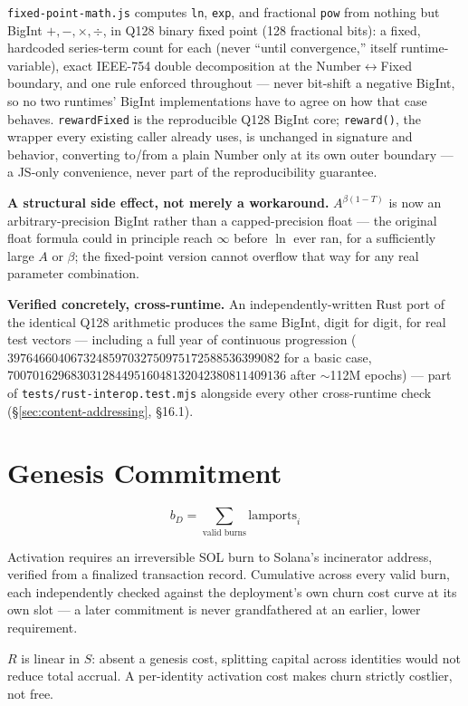 \documentclass[10pt]{article}
\newcommand{\code}[1]{\texttt{\small #1}}
\begin{document}
\code{fixed-point-math.js} computes \code{ln}, \code{exp}, and fractional \code{pow} from nothing but BigInt $+, -, \times, \div$, in Q128 binary fixed point (128 fractional bits): a fixed, hardcoded series-term count for each (never ``until convergence,'' itself runtime-variable), exact IEEE-754 double decomposition at the Number$\leftrightarrow$Fixed boundary, and one rule enforced throughout --- never bit-shift a negative BigInt, so no two runtimes' BigInt implementations have to agree on how that case behaves. \code{rewardFixed} is the reproducible Q128 BigInt core; \code{reward()}, the wrapper every existing caller already uses, is unchanged in signature and behavior, converting to/from a plain Number only at its own outer boundary --- a JS-only convenience, never part of the reproducibility guarantee.

\textbf{A structural side effect, not merely a workaround.} $A^{\beta(1-T)}$ is now an arbitrary-precision BigInt rather than a capped-precision float --- the original float formula could in principle reach $\infty$ before $\ln$ ever ran, for a sufficiently large $A$ or $\beta$; the fixed-point version cannot overflow that way for any real parameter combination.

\textbf{Verified concretely, cross-runtime.} An independently-written Rust port of the identical Q128 arithmetic produces the same BigInt, digit for digit, for real test vectors --- including a full year of continuous progression ($3976466040673248597032750975172588536399082$ for a basic case, $70070162968303128449516048132042380811409136$ after $\sim$112M epochs) --- part of \code{tests/rust-interop.test.mjs} alongside every other cross-runtime check (\S\ref{sec:content-addressing}, \S16.1).

\section{Genesis Commitment}
\label{sec:genesis}

\[
b_D = \sum_{\text{valid burns}} \mathrm{lamports}_i
\]

Activation requires an irreversible SOL burn to Solana's incinerator address, verified from a finalized transaction record. Cumulative across every valid burn, each independently checked against the deployment's own churn cost curve at its own slot --- a later commitment is never grandfathered at an earlier, lower requirement.

$R$ is linear in $S$: absent a genesis cost, splitting capital across identities would not reduce total accrual. A per-identity activation cost makes churn strictly costlier, not free.
\end{document}

